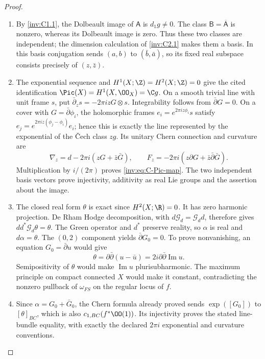 \begin{proof}
\begin{enumerate}[label=\arabic*.,leftmargin=*]
\item By \ref{inv:C1.1}, the Dolbeault image of $\mathsf A$ is
$d_1g\ne0$. The class $\mathsf B=\overline{\mathsf A}$ is nonzero,
whereas its Dolbeault image is zero. Thus these two classes are
independent; the dimension calculation of \ref{inv:C2.1} makes
them a basis. In this basis conjugation sends $(a,b)$ to
$(\bar b,\bar a)$, so its fixed real subspace consists precisely
of $(z,\bar z)$.

\item The exponential sequence and $H^1(X;\Z)=H^2(X;\Z)=0$ give the
cited identification $\Pic(X)=H^1(X,\OO_X)=\C g$.
On a smooth trivial line with unit frame $s$, put
$\bar\partial_zs=-2\pi izG\otimes s$. Integrability follows from
$\bar\partial G=0$. On a cover with $G=\bar\partial\phi_i$,
the holomorphic frames $e_i=e^{2\pi iz\phi_i}s$ satisfy
$e_j=e^{2\pi iz(\phi_j-\phi_i)}e_i$; hence this is exactly the
line represented by the exponential of the \v Cech class $zg$.
Its unitary Chern connection and curvature are
\[
 \nabla_z=d-2\pi i(zG+\bar z\bar G),\qquad
 F_z=-2\pi i(z\partial G+\bar z\bar\partial\bar G).
\]
Multiplication by $i/(2\pi)$ proves \eqref{inv:eq:C-Pic-map}.
The two independent basis vectors prove injectivity, additivity
as real Lie groups and the assertion about the image.

\item The closed real form $\theta$ is exact since $H^2(X;\R)=0$.
It has zero harmonic projection. De Rham Hodge decomposition,
with $d\mathcal G_d=\mathcal G_dd$, therefore gives
$dd^*\mathcal G_d\theta=\theta$. The Green operator and $d^*$
preserve reality, so $\alpha$ is real and $d\alpha=\theta$.
The $(0,2)$ component yields $\bar\partial G_0=0$.
To prove nonvanishing, an equation $G_0=\bar\partial u$ would give
\[
 \theta=\partial\bar\partial(u-\bar u)
       =2i\partial\bar\partial\operatorname{Im}u.
\]
Semipositivity of $\theta$ would make $\operatorname{Im}u$
plurisubharmonic. The maximum principle on compact connected $X$
would make it constant, contradicting the nonzero pullback of
$\omega_{FS}$ on the regular locus of $f$.

\item Since $\alpha=G_0+\bar G_0$, the Chern formula already proved
sends $\exp([G_0])$ to $[\theta]_{BC}$, which is also
$c_{1,BC}(f^*\OO(1))$. Its injectivity proves the stated
line-bundle equality, with exactly the declared $2\pi i$
exponential and curvature conventions.


\end{enumerate}
\end{proof}
